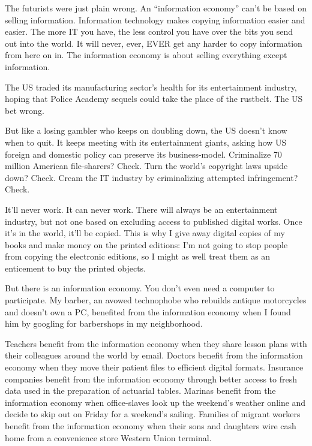 The futurists were just plain wrong. An ``information economy'' can't
be based on selling information. Information technology makes
copying information easier and easier. The more IT you have, the
less control you have over the bits you send out into the world. It
will never, ever, EVER get any harder to copy information from here
on in. The information economy is about selling everything except
information.

The US traded its manufacturing sector's health for its
entertainment industry, hoping that Police Academy sequels could
take the place of the rustbelt. The US bet wrong.

But like a losing gambler who keeps on doubling down, the US
doesn't know when to quit. It keeps meeting with its entertainment
giants, asking how US foreign and domestic policy can preserve its
business-model. Criminalize 70 million American file-sharers?
Check. Turn the world's copyright laws upside down? Check. Cream
the IT industry by criminalizing attempted infringement? Check.

It'll never work. It can never work. There will always be an
entertainment industry, but not one based on excluding access to
published digital works. Once it's in the world, it'll be copied.
This is why I give away digital copies of my books and make money
on the printed editions: I'm not going to stop people from copying
the electronic editions, so I might as well treat them as an
enticement to buy the printed objects.

But there is an information economy. You don't even need a computer
to participate. My barber, an avowed technophobe who rebuilds
antique motorcycles and doesn't own a PC, benefited from the
information economy when I found him by googling for barbershops in
my neighborhood.

Teachers benefit from the information economy when they share
lesson plans with their colleagues around the world by email.
Doctors benefit from the information economy when they move their
patient files to efficient digital formats. Insurance companies
benefit from the information economy through better access to fresh
data used in the preparation of actuarial tables. Marinas benefit
from the information economy when office-slaves look up the
weekend's weather online and decide to skip out on Friday for a
weekend's sailing. Families of migrant workers benefit from the
information economy when their sons and daughters wire cash home
from a convenience store Western Union terminal.

